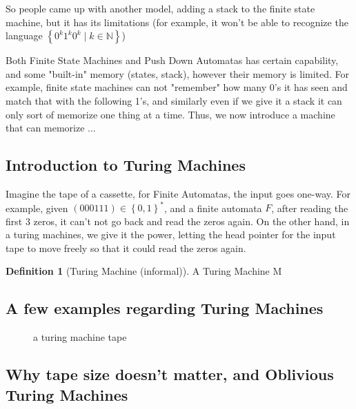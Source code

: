 \documentclass[a4paper,12pt]{article}
\theoremstyle{definition}
\newtheorem{definition}{Definition}[section]
\theoremstyle{remark}
\begin{document}
So people came up with another model, adding a stack to the finite state machine, but it has its limitations (for example, it won't be able to recognize the language $\left\{0^k1^k0^k \mid k \in \mathbb{N}\right\}$)

Both Finite State Machines and Push Down Automatas has certain capability, and some "built-in" memory (states, stack), however their memory is limited. For example, finite state machines can not "remember" how many 0's it has seen and match that with the following 1's, and similarly even if we give it a stack it can only sort of memorize one thing at a time. Thus, we now introduce a machine that can memorize ...

\subsection{Introduction to Turing Machines}
Imagine the tape of a cassette, for Finite Automatas, the input goes one-way. For example, given $(000111) \in \left\{0,1\right\}^{*}$, and a finite automata $F$, after reading the first 3 zeros, it can't not go back and read the zeros again. On the other hand, in a turing machines, we give it the power, letting the head pointer for the input tape to move freely so that it could read the zeros again.

\begin{definition}[Turing Machine (informal)]
A Turing Machine M 
\end{definition}
\subsection{A few examples regarding Turing Machines}

\begin{figure}[h]
\centering
{}
\caption{a turing machine tape}
\label{fig:figure name}
\end{figure}

\subsection{Why tape size doesn't matter, and Oblivious Turing Machines}
\end{document}
